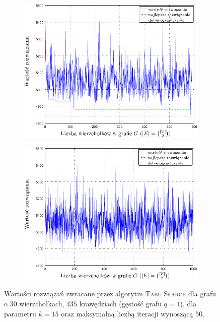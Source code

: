 \begin{figure}[!h]
	\null\hfill
	\begin{subfigure}[b]{0.45\textwidth}
		\includegraphics[width=\textwidth]{Chapter_VI/RRIMST10-example/RRIMST10_psfrag}
		\caption{}
		\label{fig:rrimst4:a}
	\end{subfigure}
	\hfill
	\begin{subfigure}[b]{0.45\textwidth}
		\includegraphics[width=\textwidth]{Chapter_VI/RRIMST11-example/RRIMST11_psfrag}
		\caption{}
		\label{fig:rrimst4:b}
	\end{subfigure}
	\hfill\null
	\caption{
		Wartości rozwiązań zwracane przez algorytm \textsc{Tabu Search} dla grafu o $30$ wierzchołkach, $435$ krawędziach (gęstość grafu $q = 1$), dla parametru $k = 15$ oraz maksymalną liczbą iteracji wynoszącą $50$.
}
\end{figure}
